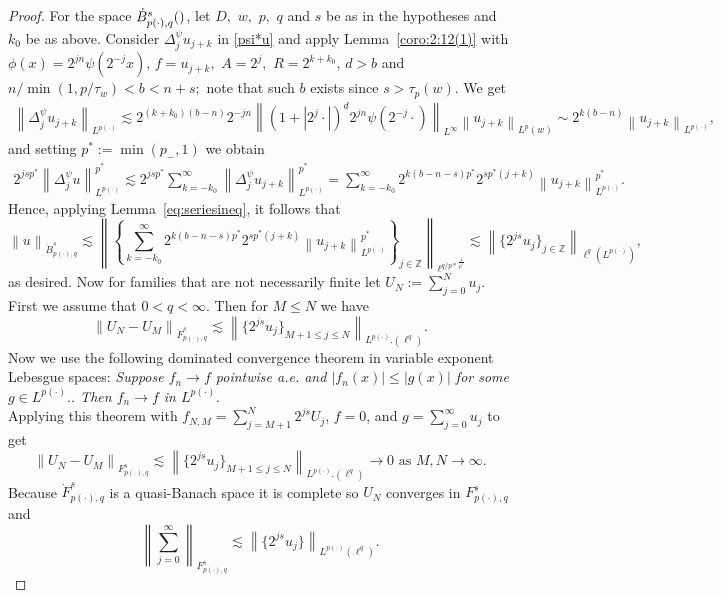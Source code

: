 \documentclass[10pt,a4paper]{article}
\theoremstyle{remark}
\newcommand{\ent}{\mathbb{Z}}
\newcommand{\tl}[3]{\dot F_{#1,#3}^{#2}} %
\newcommand{\itl}[3]{F_{#1,#3}^{#2}} %
\newcommand{\besw}[4]{\dot B_{#1,#3}^{#2}(#4)} %
\newcommand{\bes}[3]{\dot B_{#1,#3}^{#2}} %
\newcommand{\Lp}{L^{p(\cdot)}} %
\newcommand{\pp}{{p(\cdot)}}
\newcommand{\norm}[2]{\left\|#1\right\|_{#2}}
\newcommand{\A}{D}
\newcommand{\ex}{d}
\begin{document}
\begin{proof}
For the space $\besw{\pp}{s}{q}$, let $\A,$ $w,$ $p,$ $q$ and $s$ be as in the hypotheses and $k_0$ be as above. 
Consider $\Delta^\psi_j  u_{j+k}$  in  \eqref{psi*u} and  apply  Lemma~\ref{coro:2:12(1)}  with $\phi(x)=2^{jn}\psi(2^{-j} x)$, $f= u_{j+k},$ $A=2^{j},$ $R=2^{k +  k_0}$,  $\ex>b$ and $  n /\min(1,p/\tau_w)<b<n+s;$ note that such $b$ exists since $s>\tau_p(w).$ We get
\begin{align*}
 \norm{\Delta^\psi_j  u_{j+k}}{\Lp}  \lesssim 2^{(k + k_0)(b-n)} 2^{- j  n} \norm{(1 + |2^j \cdot|)^\ex 2^{jn}\psi(2^{-j}\cdot)}{L^\infty} \norm{u_{j+k}}{L^p(w)}\sim 2^{k(b-n)}   \norm{u_{j+k}}{\Lp},
\end{align*}
and setting $p^*:=\min(p_-,1)$ we obtain
\begin{align*}
2^{js p^*}\norm{\Delta^\psi_j  u}{\Lp}^{p^*} \lesssim 2^{js p^*}\sum_{k = - k_0}^\infty \norm{\Delta^\psi_j  u_{j+k}}{\Lp}^{p^*}
 =  \sum_{k = - k_0}^\infty 2^{k(b-n -s) p^*} 2^{s p^* (j+k)}   \norm{u_{j+k}}{\Lp}^{p^*}.
\end{align*}
Hence, applying Lemma~\ref{eq:seriesineq}, it follows that
\[
\norm{u}{\bes{\pp}{s}{q}}  
\lesssim  
\norm{\left\{ \sum_{k = - k_0}^\infty 2^{k(b-n -s) p^*}  2^{s p^* (j+k)}   \norm{u_{j+k}}{\Lp}^{p^*}\right\}_{j\in\ent}}{{\ell^{q/p*}}^\frac{1}{p^*}}
\lesssim  
\norm{\{2^{js} u_j\}_{j\in\ent}}{\ell^{q}(\Lp)}, 
\]
as desired.
Now for families that are not necessarily finite let $U_N := \sum_{j=0}^N u_j$. First we assume that $0<q<\infty$. Then for $M\leq N$ we have
\begin{equation}
\norm{U_N -U_M}{\tl{\pp}{s}{q}} \lesssim \norm{\{2^{js} u_j\}_{M+1\leq j \leq N}}{\Lp.(\ell^q)}.
\end{equation}
Now we use the following dominated convergence theorem in variable exponent Lebesgue spaces: 
\textit{Suppose $f_n \rightarrow f$ pointwise a.e. and $|f_n (x)| \leq |g(x)|$ for some $g\in \Lp.$. Then $f_n \rightarrow f$ in $\Lp.$}
\\
\medskip
Applying this theorem with $f_{N,M} = \sum_{j=M+1}^N 2^{js}U_j$, $f = 0$, and $g = \sum_{j=0}^\infty u_j$ to get 
\begin{equation}
\norm{U_N -U_M}{\itl{\pp}{s}{q}} \lesssim \norm{\{2^{js} u_j\}_{M+1\leq j \leq N}}{\Lp.(\ell^q)} \rightarrow 0 \text{ as } M,N \rightarrow \infty.
\end{equation}
Because $\tl{\pp}{s}{q}$ is a quasi-Banach space it is complete so $U_N$ converges in $\itl{\pp}{s}{q}$ and 
\begin{equation}
\norm{\sum_{j=0}^\infty}{\itl{\pp}{s}{q}} \lesssim \norm{\{2^{js} u_j\}}{\Lp(\ell^q)}.
\end{equation}


\end{proof}
\end{document}
